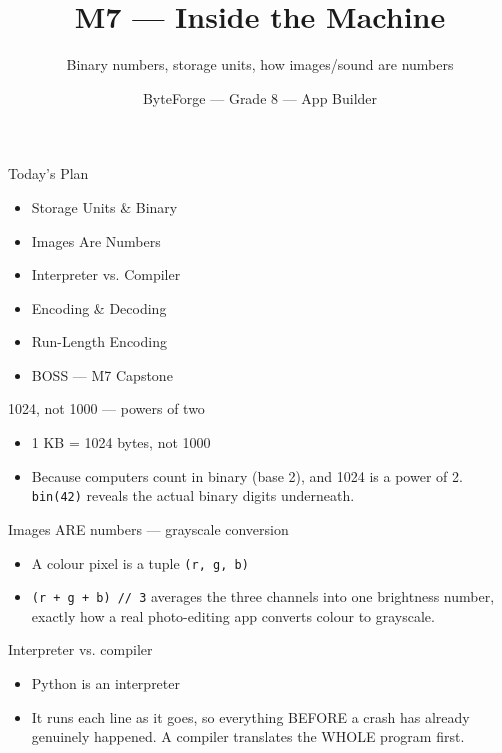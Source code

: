 \documentclass[aspectratio=169]{beamer}
\title{M7 — Inside the Machine}
\subtitle{Binary numbers, storage units, how images/sound are numbers}
\author{ByteForge --- Grade 8 --- App Builder}
\date{}
\begin{document}
\begin{frame}
    \titlepage
\end{frame}

\begin{frame}{Today's Plan}
    \begin{itemize}
        \item Storage Units \& Binary
        \item Images Are Numbers
        \item Interpreter vs. Compiler
        \item Encoding \& Decoding
        \item Run-Length Encoding
        \item[$\bigstar$] BOSS --- M7 Capstone
    \end{itemize}
\end{frame}

\begin{frame}{1024, not 1000 — powers of two}
    \large
    \begin{itemize}
        \item 1 KB = 1024 bytes, not 1000
        \item Because computers count in binary (base 2), and 1024 is a power of 2. \texttt{bin(42)} reveals the actual binary digits underneath.
    \end{itemize}
\end{frame}


\begin{frame}{Images ARE numbers — grayscale conversion}
    \large
    \begin{itemize}
        \item A colour pixel is a tuple \texttt{(r, g, b)}
        \item \texttt{(r + g + b) // 3} averages the three channels into one brightness number, exactly how a real photo-editing app converts colour to grayscale.
    \end{itemize}
\end{frame}


\begin{frame}{Interpreter vs. compiler}
    \large
    \begin{itemize}
        \item Python is an interpreter
        \item It runs each line as it goes, so everything BEFORE a crash has already genuinely happened. A compiler translates the WHOLE program first.
    \end{itemize}
\end{frame}
\end{document}
